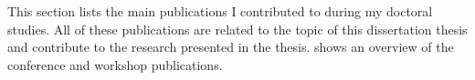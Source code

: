 \newcommand{\corehref}[2]{\href{https://portal.core.edu.au/conf-ranks/#1/}{#2}}
\newcommand{\core}[3]{\corehref{#3}{CORE#1 conference rank: #2}}
\newcommand{\wosurl}[1]{https://www.webofscience.com/wos/woscc/full-record/WOS:#1}
\newcommand{\woshref}[2]{\href{\wosurl{#1}}{#2}}
\newcommand{\wos}[1]{\woshref{#1}{Web of Science record: #1}}
\newcommand{\scholar}{Source: \href{https://scholar.google.com/}{Google Scholar}. Date extracted: \DTMdisplaydate{2024}{9}{11}{-1}.}
\newcommand{\citations}[4]{\href{https://scholar.google.com/scholar?cites=#4}{Number of external citations: #2}}

This section lists the main publications I contributed to during my doctoral studies.
All of these publications are related to the topic of this dissertation thesis and contribute to the research presented in the thesis.
 shows an overview of the conference and workshop publications.


